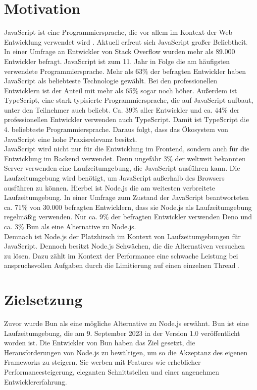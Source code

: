 \pagestyle{fancy-style}

\section{Motivation}
JavaScript ist eine Programmiersprache, die vor allem im Kontext der Web-Entwicklung verwendet wird \cite{Brown.November2019}. Aktuell erfreut sich JavaScript großer Beliebtheit. In einer Umfrage an Entwickler von Stack Overflow wurden mehr als 89.000 Entwickler befragt. JavaScript ist zum 11. Jahr in Folge die am häufigsten verwendete Programmiersprache. Mehr als 63\% der befragten Entwickler haben JavaScript als beliebteste Technologie gewählt. Bei den professionellen Entwicklern ist der Anteil mit mehr als 65\% sogar noch höher. Außerdem ist TypeScript, eine stark typisierte Programmiersprache, die auf 
JavaScript aufbaut, unter den Teilnehmer auch beliebt. Ca. 39\% aller Entwickler und ca. 44\% der professionellen Entwickler verwenden auch TypeScript. Damit ist TypeScript die 4. beliebteste Programmiersprache. \cite{StackOverflow.2023} Daraus folgt, dass das Ökosystem von JavaScript eine hohe Praxisrelevanz besitzt. \\

\noindent
JavaScript wird nicht nur für die Entwicklung im Frontend, sondern auch für die Entwicklung im Backend 
verwendet. Denn ungefähr 3\% der weltweit bekannten Server verwenden eine Laufzeitumgebung, die JavaScript 
ausführen kann. \cite{QSuccess.2023} Die Laufzeitumgebung wird benötigt, um JavaScript außerhalb des Browsers ausführen zu können.
Hierbei ist Node.js die am weitesten verbreitete Laufzeitumgebung. In einer Umfrage zum Zustand der JavaScript
beantworteten ca. 71\% von 30.000 befragten Entwicklern, dass sie Node.js als Laufzeitumgebung regelmäßig verwenden.
Nur ca. 9\% der befragten Entwickler verwenden Deno und ca. 3\% Bun als eine Alternative zu Node.js. \cite{Greif.2022} \\

\noindent
Demnach ist Node.js der Platzhirsch im Kontext von Laufzeitumgebungen für JavaScript. Dennoch besitzt Node.js Schwächen, die die Alternativen versuchen zu lösen. Dazu zählt im Kontext der Performance eine schwache Leistung bei anspruchsvollen
Aufgaben durch die Limitierung auf einen einzelnen Thread \cite{Chhetri.2016}.


\section{Zielsetzung}
Zuvor wurde Bun als eine mögliche Alternative zu Node.js erwähnt. Bun ist eine Laufzeitumgebung, die am 9. September 2023 in der Version 1.0 veröffentlicht worden ist. Die Entwickler von Bun haben das Ziel gesetzt, die Herausforderungen von Node.js zu bewältigen, um so die Akzeptanz des eigenen Frameworks zu steigern. Sie werben mit Features wie erheblicher Performancesteigerung, eleganten Schnittstellen und einer angenehmen Entwicklererfahrung. \cite{Sumner.2023} \\

